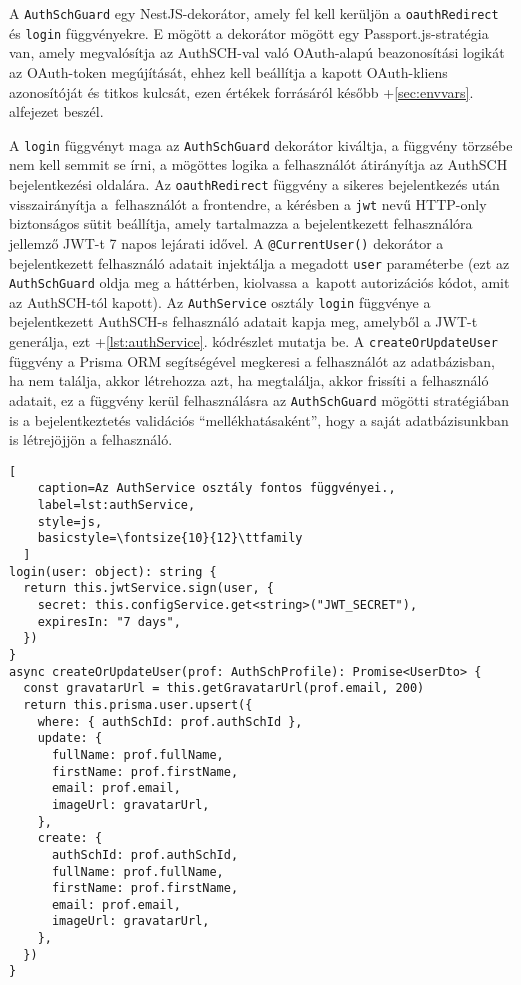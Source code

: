 A \verb|AuthSchGuard| egy NestJS-dekorátor, amely fel kell kerüljön a \verb|oauthRedirect| és \verb|login| függvényekre. E mögött a dekorátor mögött egy Passport.js-stratégia\cite{passport} van, amely megvalósítja az AuthSCH-val való OAuth-alapú beazonosítási logikát az OAuth-token megújítását, ehhez kell beállítja a kapott OAuth-kliens azonosítóját és titkos kulcsát, ezen értékek forrásáról később \az+\ref{sec:envvars}. alfejezet beszél.

A \verb|login| függvényt maga az \verb|AuthSchGuard| dekorátor kiváltja, a függvény törzsébe nem kell semmit se írni, a mögöttes logika a felhasználót átirányítja az AuthSCH bejelentkezési oldalára. Az \verb|oauthRedirect| függvény a sikeres bejelentkezés után visszairányítja a~felhasználót a frontendre, a kérésben a \verb|jwt| nevű HTTP-only biztonságos sütit beállítja\cite{ietf-oauth-security-topics-13}, amely tartalmazza a bejelentkezett felhasználóra jellemző JWT-t 7 napos lejárati idővel. A \verb|@CurrentUser()| dekorátor a bejelentkezett felhasználó adatait injektálja a megadott \verb|user| paraméterbe (ezt az \verb|AuthSchGuard| oldja meg a háttérben, kiolvassa a~kapott autorizációs kódot, amit az AuthSCH-tól kapott). Az \verb|AuthService| osztály \verb|login| függvénye a bejelentkezett AuthSCH-s felhasználó adatait kapja meg, amelyből a JWT-t generálja, ezt \az+\ref{lst:authService}. kódrészlet mutatja be. A \verb|createOrUpdateUser| függvény a Prisma ORM segítségével megkeresi a felhasználót az adatbázisban, ha nem találja, akkor létrehozza azt, ha megtalálja, akkor frissíti a felhasználó adatait, ez a függvény kerül felhasználásra az \verb|AuthSchGuard| mögötti stratégiában is a bejelentkeztetés validációs ``mellékhatásaként'', hogy a saját adatbázisunkban is létrejöjjön a felhasználó.

\begin{minipage}{0.92\textwidth}
  \begin{lstlisting}[
    caption=Az AuthService osztály fontos függvényei.,
    label=lst:authService,
    style=js,
    basicstyle=\fontsize{10}{12}\ttfamily
  ]
login(user: object): string {
  return this.jwtService.sign(user, {
    secret: this.configService.get<string>("JWT_SECRET"),
    expiresIn: "7 days",
  })
}
async createOrUpdateUser(prof: AuthSchProfile): Promise<UserDto> {
  const gravatarUrl = this.getGravatarUrl(prof.email, 200)
  return this.prisma.user.upsert({
    where: { authSchId: prof.authSchId },
    update: {
      fullName: prof.fullName,
      firstName: prof.firstName,
      email: prof.email,
      imageUrl: gravatarUrl,
    },
    create: {
      authSchId: prof.authSchId,
      fullName: prof.fullName,
      firstName: prof.firstName,
      email: prof.email,
      imageUrl: gravatarUrl,
    },
  })
}
\end{lstlisting}
\end{minipage}

